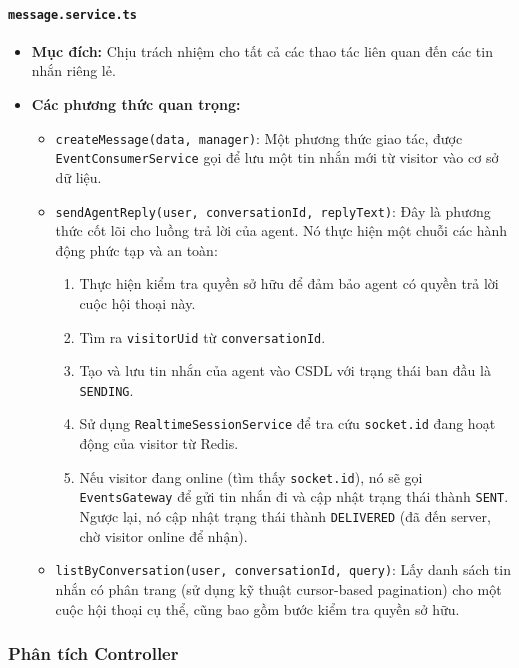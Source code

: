 \paragraph{\texttt{message.service.ts}}
\begin{itemize}
    \item \textbf{Mục đích:} Chịu trách nhiệm cho tất cả các thao tác liên quan đến các tin nhắn riêng lẻ.
    \item \textbf{Các phương thức quan trọng:}    
    \begin{itemize}
        \item \texttt{createMessage(data, manager)}: Một phương thức giao tác, được \texttt{EventConsumerService} gọi để lưu một tin nhắn mới từ visitor vào cơ sở dữ liệu.
        \item \texttt{sendAgentReply(user, conversationId, replyText)}: Đây là phương thức cốt lõi cho luồng trả lời của agent. Nó thực hiện một chuỗi các hành động phức tạp và an toàn:
        \begin{enumerate}
            \item Thực hiện kiểm tra quyền sở hữu để đảm bảo agent có quyền trả lời cuộc hội thoại này.
            \item Tìm ra \texttt{visitorUid} từ \texttt{conversationId}.
            \item Tạo và lưu tin nhắn của agent vào CSDL với trạng thái ban đầu là \texttt{SENDING}.
            \item Sử dụng \texttt{RealtimeSessionService} để tra cứu \texttt{socket.id} đang hoạt động của visitor từ Redis.
            \item Nếu visitor đang online (tìm thấy \texttt{socket.id}), nó sẽ gọi \texttt{EventsGateway} để gửi tin nhắn đi và cập nhật trạng thái thành \texttt{SENT}. Ngược lại, nó cập nhật trạng thái thành \texttt{DELIVERED} (đã đến server, chờ visitor online để nhận).
        \end{enumerate}
        \item \texttt{listByConversation(user, conversationId, query)}: Lấy danh sách tin nhắn có phân trang (sử dụng kỹ thuật cursor-based pagination) cho một cuộc hội thoại cụ thể, cũng bao gồm bước kiểm tra quyền sở hữu.
    \end{itemize}
\end{itemize}


\subsubsection{Phân tích Controller}
\label{subsubsec:inbox-controller}


